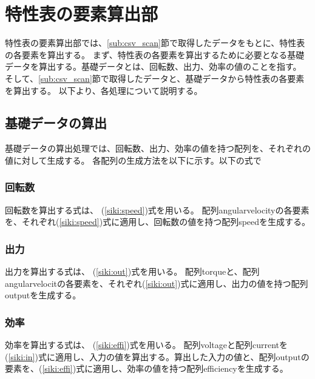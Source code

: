 \section{特性表の要素算出部}\label{youso_sec}
特性表の要素算出部では、\ref{sub:csv_scan}節で取得したデータをもとに、特性表の各要素を算出する。
まず、特性表の各要素を算出するために必要となる基礎データを算出する。基礎データとは、回転数、出力、効率の値のことを指す。
そして、\ref{sub:csv_scan}節で取得したデータと、基礎データから特性表の各要素を算出する。
以下より、各処理について説明する。

\subsection{基礎データの算出}\label{sub:youso_kiso}
基礎データの算出処理では、回転数、出力、効率の値を持つ配列を、それぞれの値に対して生成する。
各配列の生成方法を以下に示す。以下の式で

\subsubsection{回転数}\label{sub:sub:kaiten}
回転数を算出する式は、%
(\ref{siki:speed})式を用いる。
配列angularvelocityの各要素を、それぞれ(\ref{siki:speed})式に適用し、回転数の値を持つ配列speedを生成する。

\subsubsection{出力}\label{sub:sub:syutu}
出力を算出する式は、%
(\ref{siki:out})式を用いる。
配列torqueと、配列angularvelocitの各要素を、それぞれ(\ref{siki:out})式に適用し、出力の値を持つ配列outputを生成する。
\subsubsection{効率}\label{sub:sub:kouritu}
効率を算出する式は、%
(\ref{siki:effi})式を用いる。
配列voltageと配列currentを(\ref{siki:in})式に適用し、入力の値を算出する。算出した入力の値と、配列outputの要素を、(\ref{siki:effi})式に適用し、効率の値を持つ配列efficiencyを生成する。

